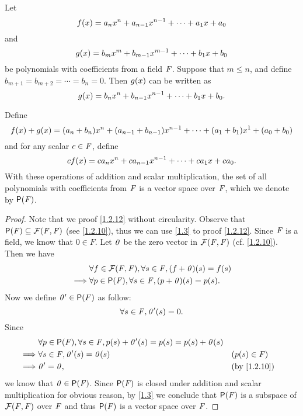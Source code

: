 \begin{eg}\label{1.2.12}
	Let
	\[
		f\p{x} = a_{n} x^{n} + a_{n - 1} x^{n - 1} + \cdots + a_{1} x + a_{0}
	\]
	and
	\[
		g\p{x} = b_{m} x^{m} + b_{m - 1} x^{m - 1} + \cdots + b_{1} x + b_{0}
	\]
	be polynomials with coefficients from a field \(\mathit{F}\).
	Suppose that \(m \leq n\), and define \(b_{m + 1} = b_{m + 2} = \cdots = b_{n} = 0\).
	Then \(g\p{x}\) can be written as
	\[
		g\p{x} = b_{n} x^{n} + b_{n - 1} x^{n - 1} + \cdots + b_{1} x + b_{0}.
	\]

	Define
	\[
		f\p{x} + g\p{x} = \p{a_{n} + b_{n}} x^{n} + \p{a_{n - 1} + b_{n - 1}} x^{n - 1} + \cdots + \p{a_{1} + b_{1}} x^{1} + \p{a_{0} + b_{0}}
	\]
	and for any scalar \(c \in \mathit{F}\), define
	\[
		cf\p{x} = ca_{n} x^{n} + ca_{n - 1} x^{n - 1} + \cdots + ca_{1} x + ca_{0}.
	\]
	With these operations of addition and scalar multiplication, the set of all polynomials with coefficients from \(\mathit{F}\) is a vector space over \(\mathit{F}\), which we denote by \(\ps{\F}\).
\end{eg}

\begin{proof}
	Note that we proof \cref{1.2.12} without circularity.
	Observe that \(\ps{\F} \subseteq \fs{\F}{\F}\) (see \cref{1.2.10}), thus we can use \cref{1.3} to proof \cref{1.2.12}.
	Since \(\mathit{F}\) is a field, we know that \(0 \in F\).
	Let \(\mathit{0}\) be the zero vector in \(\fs{\F}{\F}\) (cf. \cref{1.2.10}).
	Then we have
	\begin{align*}
		         & \forall f \in \fs{\F}{\F}, \forall s \in \F, \p{f + \zv}\p{s} = f\p{s} \\
		\implies & \forall p \in \ps{\F}, \forall s \in \F, \p{p + \zv}\p{s} = p\p{s}.
	\end{align*}
	Now we define \(\zv' \in \ps{F}\) as follow:
	\[
		\forall s \in \F, \zv'\p{s} = 0.
	\]
	Since
	\begin{align*}
		         & \forall p \in \ps{\F}, \forall s \in \F, p\p{s} + \zv'\p{s} = p\p{s} = p\p{s} + \zv\p{s}                                \\
		\implies & \forall s \in \F, \zv'\p{s} = \zv\p{s}                                                   &  & (p\p{s} \in \F)           \\
		\implies & \zv' = \zv,                                                                              &  & \text{(by \cref{1.2.10})}
	\end{align*}
	we know that \(\zv \in \ps{\F}\).
	Since \(\ps{\F}\) is closed under addition and scalar multiplication for obvious reason, by \cref{1.3} we conclude that \(\ps{\F}\) is a subspace of \(\fs{\F}{\F}\) over \(\mathit{F}\) and thus \(\ps{\F}\) is a vector space over \(\mathit{F}\).
\end{proof}

